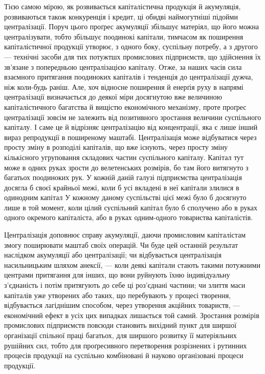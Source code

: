 Тією самою мірою, як розвивається капіталістична продукція
й акумуляція, розвиваються також конкуренція і кредит,
ці обидві наймогутніші підойми централізації. Поруч цього
проґрес акумуляції збільшує матеріял, що його можна централізувати,
тобто збільшує поодинокі капітали, тимчасом як поширення
капіталістичної продукції утворює, з одного боку,
суспільну потребу, а з другого — технічні засоби для тих потужтшх
промислових підприємств, що здійснення їх зв’язане з попередньою
централізацією капіталу. Отже, за наших часів сила
взаємного притягання поодиноких капіталів і тенденція до централізації
дужча, ніж коли-будь раніш. Але, хоч відносне поширення
й енерґія руху в напрямі централізації визначається до
деякої міри досягнутою вже величиною капіталістичного багатства
й вищістю економічного механізму, проте проґрес централізації
зовсім не залежить від позитивного зростання величини
суспільного капіталу. І саме це й відрізняє централізацію від
концентрації, яка є лише інший вираз репродукції в поширеному
маштабі. Централізація може відбуватися через просту зміну
в розподілі капіталів, що вже існують, через просту зміну кількісного
угруповання складових частин суспільного капіталу.
Капітал тут може в одних руках зрости до велетенських розмірів,
бо там його витягнуто з багатьох поодиноких рук. У кожній
даній галузі підприємства централізація досягла б своєї крайньої
межі, коли б усі вкладені в неї капітали злилися в одинодним
капітал У кожному даному суспільстві цієї межі було б
досягнуто лише в той момент, коли цілий суспільний капітал
було б сполучено або в руках одного окремого капіталіста, або
в руках одним-одного товариства капіталістів.

Централізація доповнює справу акумуляції, даючи промисловим
капіталістам змогу поширювати маштаб своїх операцій.
Чи буде цей останній результат наслідком акумуляції або централізації;
чи відбувається централізація насильницьким шляхом
анексії, — коли деякі капітали стають такими потужними
центрами притягання для інших, що вони руйнують їхню індивідуальну
з’єднаність і потім притягують до себе ці роз’єднані
частини; чи злиття маси капіталів уже утворених або таких,
що перебувають у процесі творення, відбувається лагіднішим
способом, через утворення акційних товариств, — економічний
ефект в усіх цих випадках лишається той самий. Зростання розмірів
промислових підприємств повсюди становить вихідний
пункт для ширшої організації спільної праці багатьох, для
ширшого розвитку її матеріяльних рушійних сил, тобто для
проґресивного перетворення розрізнених і рутинних процесів
продукції на суспільно комбіновані й науково організовані
процеси продукції.


